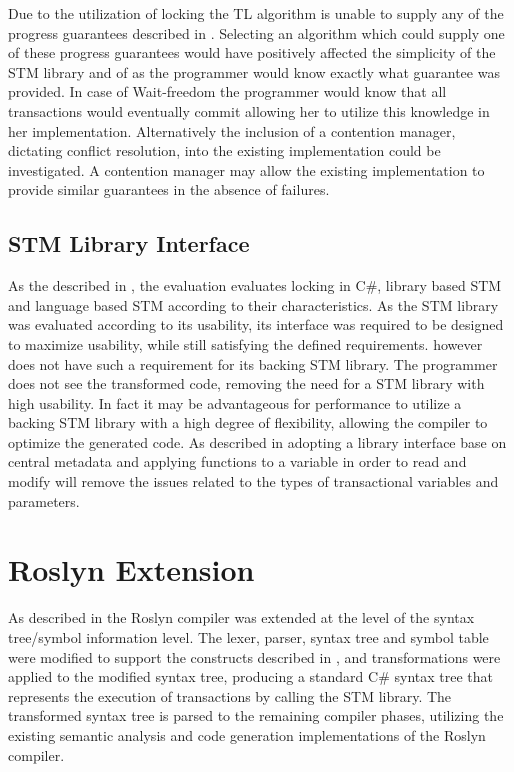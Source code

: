 Due to the utilization of locking the TL algorithm is unable to supply any of the progress guarantees described in . Selecting an algorithm which could supply one of these progress guarantees would have positively affected the simplicity of the \ac{STM} library and of \stmname as the programmer would know exactly what guarantee was provided. In case of Wait-freedom the programmer would know that all transactions would eventually commit allowing her to utilize this knowledge in her implementation. Alternatively the inclusion of a contention manager, dictating conflict resolution, into the existing implementation could be investigated. A contention manager may allow the existing implementation to provide similar guarantees in the absence of failures.

\subsection{STM Library Interface}
As the described in , the evaluation evaluates locking in C\#, library based \ac{STM} and language based \ac{STM} according to their characteristics. As the \ac{STM} library was evaluated according to its usability, its interface was required to be designed to maximize usability, while still satisfying the defined requirements. \stmname however does not have such a requirement for its backing \ac{STM} library. The programmer does not see the transformed code, removing the need for a \ac{STM} library with high usability. In fact it may be advantageous for performance to utilize a backing \ac{STM} library with a high degree of flexibility, allowing the compiler to optimize the generated code. As described in  adopting a library interface base on central metadata and applying functions to a variable in order to read and modify will remove the issues related to the types of transactional variables and  parameters.

\section{Roslyn Extension}\label{sec:reflection_roslyn_extension}
As described in  the Roslyn compiler was extended at the level of the syntax tree/symbol information level. The lexer, parser, syntax tree and symbol table were modified to support the constructs described in , and transformations were applied to the modified syntax tree, producing a standard C\# syntax tree that represents the execution of transactions by calling the \ac{STM} library. The transformed syntax tree is parsed to the remaining compiler phases, utilizing the existing semantic analysis and code generation implementations of the Roslyn compiler. 

